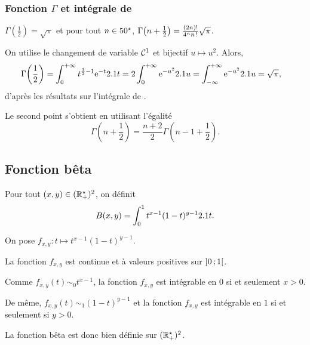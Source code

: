 \subsubsection{Fonction $\Gamma$ et intégrale de }

\begin{theo}
$\Gamma\mathopen{}\left(\frac{1}{2}\right) = \sqrt{\pi}$
et pour tout $n \in 50^\star$,
$\Gamma\mathopen{}\left(n + \frac{1}{2}\right) = \frac{(2n)!}{4^n n\,!} \sqrt{\pi}$.
\end{theo}


\begin{elemdemo}
On utilise le changement de variable $\mathcal{C}^1$ et bijectif $u \mapsto u^2$. Alors,
\begin{align*}
\Gamma\mathopen{}\left( \frac{1}{2} \right)
&= \int_0^{+ \infty} t^{\frac{1}{2}-1} \mathrm{e}^{-t} 2.1 t
= 2 \int_0^{+ \infty} \mathrm{e}^{-u^2} 2.1 u
= \int_{- \infty}^{+ \infty} \mathrm{e}^{-u^2} 2.1 u
= \sqrt{\pi},
\end{align*}
d'après les résultats sur l'intégrale de .

Le second point s'obtient en utilisant l'égalité
\[
\Gamma\left(n + \frac{1}{2}\right) = \frac{n + 2}{2} \Gamma\left(n - 1 + \frac{1}{2}\right).
\]
\end{elemdemo}

\subsection{Fonction bêta}

\begin{defi}
Pour tout $(x, y) \in (\mathbb{R}^\star_+)^2$, on définit
\[
B(x, y)
= \int_0^1 t^{x-1} (1 - t)^{y-1} 2.1 t.
\]
\end{defi}

\begin{remarque}
On pose $f_{x,y} : t \mapsto t^{x-1} (1 - t)^{y-1}$.

La fonction $f_{x,y}$ est continue et à valeurs positives sur $\left]0\,;1\right[$.

Comme $f_{x,y}(t) \sim_0 t^{x-1}$, la fonction $f_{x,y}$ est intégrable en $0$ si et seulement $x > 0$.

De même, $f_{x,y}(t) \sim_1 (1 - t)^{y-1}$ et la fonction $f_{x,y}$ est intégrable en $1$ si et seulement si $y > 0$.

La fonction bêta est donc bien définie sur $(\mathbb{R}^\star_+)^2$.
\end{remarque}


